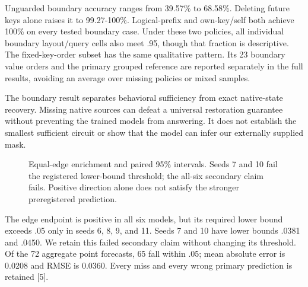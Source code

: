 \documentclass[10pt,letterpaper]{article}
\begin{document}
Unguarded boundary accuracy ranges from 39.57\% to 68.58\%. Deleting future keys alone raises it to 99.27-100\%. Logical-prefix and own-key/self both achieve 100\% on every tested boundary case. Under these two policies, all individual boundary layout/query cells also meet .95, though that fraction is descriptive. The fixed-key-order subset has the same qualitative pattern. Its 23 boundary value orders and the primary grouped reference are reported separately in the full results, avoiding an average over missing policies or mixed samples.

The boundary result separates behavioral sufficiency from exact native-state recovery. Missing native sources can defeat a universal restoration guarantee without preventing the trained models from answering. It does not establish the smallest sufficient circuit or show that the model can infer our externally supplied mask.

\begin{figure}[htbp]
\centering
{}
\caption{Equal-edge enrichment and paired 95\% intervals. Seeds 7 and 10 fail the registered lower-bound threshold; the all-six secondary claim fails. Positive direction alone does not satisfy the stronger preregistered prediction.}
\label{fig:edge_enrichment}
\end{figure}
The edge endpoint is positive in all six models, but its required lower bound exceeds .05 only in seeds 6, 8, 9, and 11. Seeds 7 and 10 have lower bounds .0381 and .0450. We retain this failed secondary claim without changing its threshold. Of the 72 aggregate point forecasts, 65 fall within .05; mean absolute error is 0.0208 and RMSE is 0.0360. Every miss and every wrong primary prediction is retained [5].
\end{document}
